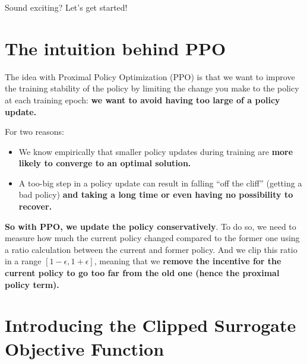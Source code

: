 \documentclass[11pt,a4paper]{article}
\begin{document}

Sound exciting? Let's get started!

\section{The intuition behind PPO}\label{the-intuition-behind-ppo}

The idea with Proximal Policy Optimization (PPO) is that we want to improve the training stability of the policy by limiting the change you make to the policy at each training epoch: \textbf{we want to avoid having too large of a policy update.}

For two reasons:

\begin{itemize}
\tightlist
\item
  We know empirically that smaller policy updates during training are \textbf{more likely to converge to an optimal solution.}
\item
  A too-big step in a policy update can result in falling ``off the cliff'' (getting a bad policy) \textbf{and taking a long time or even having no possibility to recover.}
\end{itemize}


\textbf{So with PPO, we update the policy conservatively}. To do so, we need to measure how much the current policy changed compared to the former one using a ratio calculation between the current and former policy. And we clip this ratio in a range \([1 - \epsilon, 1 + \epsilon]\), meaning that we \textbf{remove the incentive for the current policy to go too far from the old one (hence the proximal policy term).}

\section{Introducing the Clipped Surrogate Objective Function}\label{introducing-the-clipped-surrogate-objective-function}
\end{document}

